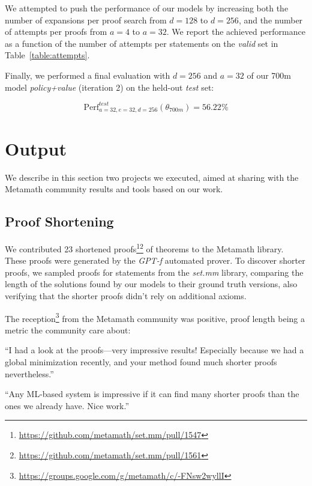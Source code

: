 \documentclass{article}
\begin{document}
We attempted to push the performance of our models by increasing both the number of expansions per proof search from $d=128$ to $d=256$, and the number of attempts per proofs from $a=4$ to $a=32$. We report the achieved performance as a function of the number of attempts per statements on the \textit{valid} set in Table~\ref{table:attempts}.

Finally, we performed a final evaluation with $d=256$ and $a=32$ of our 700m model \textit{policy+value} (iteration 2) on the held-out \textit{test} set:

$$
\text{Perf}_{a=32,e=32,d=256}^{\mathit{test}}(\theta_{\textit{700m}}) = 56.22\%
$$

\section{Output}

We describe in this section two projects we executed, aimed at sharing with the Metamath community results and tools based on our work.

\subsection{Proof Shortening}

We contributed 23 shortened proofs\footnote{\url{https://github.com/metamath/set.mm/pull/1547}}\footnote{\url{https://github.com/metamath/set.mm/pull/1561}} of theorems to the Metamath library. These proofs were generated by the \textit{GPT-f} automated prover. To discover shorter proofs, we sampled proofs for statements from the \textit{set.mm} library, comparing the length of the solutions found by our models to their ground truth versions, also verifying that the shorter proofs didn't rely on additional axioms.

The reception\footnote{\url{https://groups.google.com/g/metamath/c/-FNsw2wyllI}} from the Metamath community was positive, proof length being a metric the community care about:

\begin{displayquote}
“I had a look at the proofs—very impressive results! Especially because we had a global minimization recently, and your method found much shorter proofs nevertheless.”
\end{displayquote}

\begin{displayquote}
“Any ML-based system is impressive if it can find many shorter proofs than the ones we already have. Nice work.”
\end{displayquote}
\end{document}
